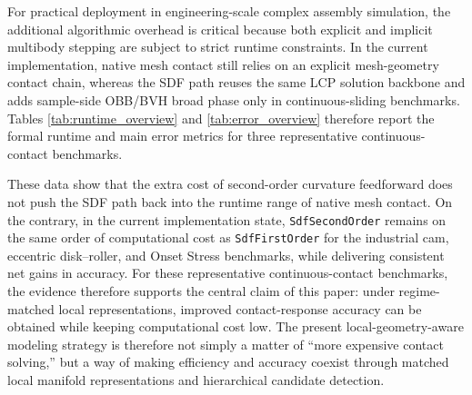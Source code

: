 For practical deployment in engineering-scale complex assembly simulation, the additional algorithmic overhead is critical because both explicit and implicit multibody stepping are subject to strict runtime constraints. In the current implementation, native mesh contact still relies on an explicit mesh-geometry contact chain, whereas the SDF path reuses the same LCP solution backbone and adds sample-side OBB/BVH broad phase only in continuous-sliding benchmarks. Tables \ref{tab:runtime_overview} and \ref{tab:error_overview} therefore report the formal runtime and main error metrics for three representative continuous-contact benchmarks.

These data show that the extra cost of second-order curvature feedforward does not push the SDF path back into the runtime range of native mesh contact. On the contrary, in the current implementation state, \texttt{SdfSecondOrder} remains on the same order of computational cost as \texttt{SdfFirstOrder} for the industrial cam, eccentric disk--roller, and Onset Stress benchmarks, while delivering consistent net gains in accuracy. For these representative continuous-contact benchmarks, the evidence therefore supports the central claim of this paper: under regime-matched local representations, improved contact-response accuracy can be obtained while keeping computational cost low. The present local-geometry-aware modeling strategy is therefore not simply a matter of ``more expensive contact solving,'' but a way of making efficiency and accuracy coexist through matched local manifold representations and hierarchical candidate detection.

\begin{table}[htbp]
    \centering
    \caption{Total runtime comparison for representative continuous-contact benchmarks}
    \label{tab:runtime_overview}
\end{table}

